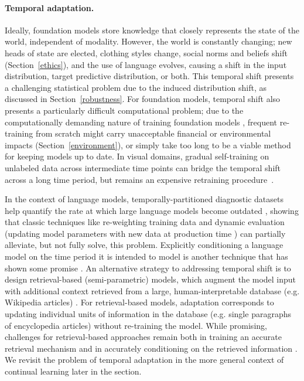 \paragraph{Temporal adaptation.} Ideally, foundation models store knowledge that closely represents the state of the world, independent of modality. However, the world is constantly changing; new heads of state are elected, clothing styles change, social norms and beliefs shift (Section~\ref{ethics}), and the use of language evolves, causing a shift in the input distribution, target predictive distribution, or both. This temporal shift presents a challenging statistical problem due to the induced distribution shift, as discussed in Section~\ref{robustness}. 
For foundation models, temporal shift also presents a particularly difficult computational problem; due to the computationally demanding nature of training foundation models \citep{shoeybi2019megatronlm,brown2020gpt3}, frequent re-training from scratch might carry unacceptable financial or environmental impacts \citep{bender2021} (Section~\ref{environment}), or simply take too long to be a viable method for keeping models up to date. In visual domains, gradual self-training on unlabeled data across intermediate time points can bridge the temporal shift across a long time period, but remains an expensive retraining procedure~\citep{kumar2020gradual}. 

In the context of language models, temporally-partitioned diagnostic datasets help quantify the rate at which large language models become outdated \citep{lazaridou2021pitfalls,hombaiah2021dynamic,dhingra2021time}, showing that classic techniques like re-weighting training data and dynamic evaluation (updating model parameters with new data at production time \citep{mikolov2010recurrent}) can partially alleviate, but not fully solve, this problem. Explicitly conditioning a language model on the time period it is intended to model is another technique that has shown some promise \citep{dhingra2021time}. An alternative strategy to addressing temporal shift is to design retrieval-based (semi-parametric) models, which augment the model input with additional context retrieved from a large, human-interpretable database (e.g. Wikipedia articles) \citep{karpukhin2020dense,lewis2020retrieval,guu2020realm,Khandelwal2020Generalization,Khattab-etal:2020:OpenQA}. For retrieval-based models, adaptation corresponds to updating individual units of information in the database (e.g. single paragraphs of encyclopedia articles) without re-training the model. While promising, challenges for retrieval-based approaches remain both in training an accurate retrieval mechanism and in accurately conditioning on the retrieved information \citep{lewis2020retrieval}. We revisit the problem of temporal adaptation in the more general context of continual learning later in the section.

